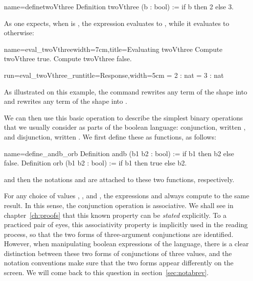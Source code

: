 \begin{coq}{name=definetwoVthree}{}
Definition twoVthree (b : bool) := if b then 2 else 3.
\end{coq}

As one expects, when  is , the expression
 evaluates to , while it evaluates to  otherwise:

\begin{coq-left}{name=eval_twoVthree}{width=7cm,title=Evaluating twoVthree}
Compute twoVthree true.
Compute twoVthree false.
\end{coq-left}
\begin{coqout-right}{run=eval_twoVthree_run}{title=Response,width=5cm}
  = 2 : nat
  = 3 : nat
\end{coqout-right}

As illustrated on this example,
the  command rewrites any term of the shape
 into  and rewrites
any term of the shape
 into .

We can then use this basic operation to describe the simplest binary
operations that we usually consider as parts of the boolean language:
conjunction, written \C{&&}, and disjunction, written \C{||}.
We first define these as functions, as follows:

\begin{coq}{name=define_andb_orb}{}
Definition andb (b1 b2 : bool) := if b1 then b2   else false.
Definition orb  (b1 b2 : bool) := if b1 then true else b2.
\end{coq}
and then the notations \C{&&} and \C{||} are attached to these
two functions, respectively.

For any choice of values , , and ,
the expressions  and  always
compute to the same result.  In this sense, the conjunction operation
is associative.  We shall see in chapter~\ref{ch:proofs} that this
known property can be \emph{stated} explicitly. To a practiced pair of
eyes, this associativity property is implicitly used in the reading
process, so that the two forms of three-argument conjunctions are
identified.
However, when manipulating boolean expressions of the \Coq{} language,
there is a clear distinction between these two forms of conjunctions
of three values, and the notation conventions make sure that the two
forms appear differently on the screen.  We will come back to this
question in section~\ref{sec:notabrev}.

